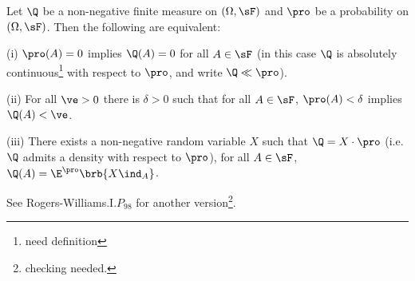 \begin{theorem}\label{thm:radon_nikodym_discrete}%
Let $\Q$ be a non-negative finite measure on $(\Omega,\sF)$ and $\pro$ be a probability on $(\Omega,\sF)$. Then the following are equivalent:
\ben
\item [(i)] $\pro(A) = 0$ implies $\Q(A) = 0$ for all $A \in \sF$ (in this case $\Q$ is absolutely continuous\footnote{need definition} with respect to $\pro$, and write $\Q \ll \pro$).
\item [(ii)] For all $\ve > 0$ there is $\delta > 0$ such that for all $A \in \sF$, $\pro(A) < \delta$ implies $\Q(A) < \ve$.
\item [(iii)] There exists a non-negative random variable $X$ such that $\Q = X \cdot \pro$ (i.e. $\Q$ admits a density with respect to $\pro$), for all $A\in \sF$, $\Q(A) = \E^\pro\brb{X\ind_A}$.
\een
\end{theorem}

\begin{remark}
See Rogers-Williams\cite{Rogers_1994}.I.$P_{98}$ for another version\footnote{checking needed.}.
\end{remark}


